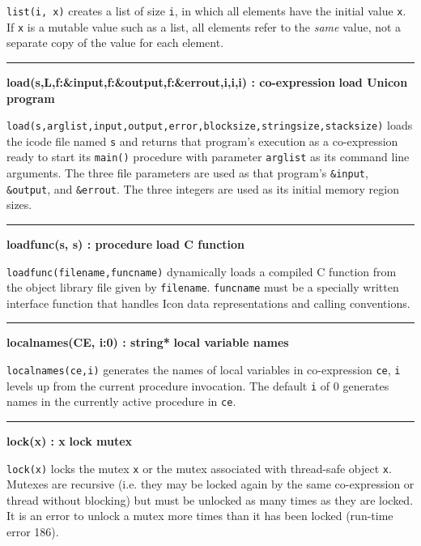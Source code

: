 \noindent
{}\texttt{list(i, x)} creates a list of size \texttt{i},
in which all elements have the initial value \texttt{x}. If \texttt{x}
is a mutable value such as a list, all elements refer to the
\textit{same} value, not a separate copy of the value for each element.

\bigskip\hrule\vspace{0.1cm}
\noindent
{\bf load(s,L,f:\&input,f:\&output,f:\&errout,i,i,i) : co-expression } \hfill {\bf load Unicon program}

\noindent
{}
\texttt{load(s,arglist,input,output,error,blocksize,stringsize,stacksize)}
loads the icode file named \texttt{s} and returns that
program's execution as a co-expression ready to start
its \texttt{main()} procedure with parameter \texttt{arglist} as its
command line arguments. The three file parameters are used as that
program's \texttt{\&input}, \texttt{\&output}, and
\texttt{\&errout}. The three integers are used as its initial memory
region sizes.

\bigskip\hrule\vspace{0.1cm}
\noindent
{\bf loadfunc(s, s) : procedure } \hfill {\bf load C function}

\noindent
{}\texttt{loadfunc(filename,funcname)} dynamically
loads a compiled C function from the object library file given by
\texttt{filename}. \texttt{funcname} must be a specially written
interface function that handles Icon data representations and calling
conventions.

\bigskip\hrule\vspace{0.1cm}
\noindent
{\bf localnames(CE, i:0) : string* } \hfill {\bf local variable names}

\noindent
{}\texttt{localnames(ce,i)} generates the
names of local variables in co-expression \texttt{ce}, \texttt{i}
levels up from the current procedure invocation. The default \texttt{i} of 0
generates names in the currently active procedure in \texttt{ce}.

\bigskip\hrule\vspace{0.1cm}
\noindent
{\bf lock(x) : x } \hfill {\bf lock mutex}

\noindent
{}\texttt{lock(x)} locks the mutex \texttt{x} or the mutex
associated with thread-safe object \texttt{x}.
Mutexes are recursive (i.e. they may be locked again by the same co-expression
or thread without blocking) but must be unlocked as many times as they are
locked. It is an error to unlock a mutex more times than it has been locked
(run-time error 186).

